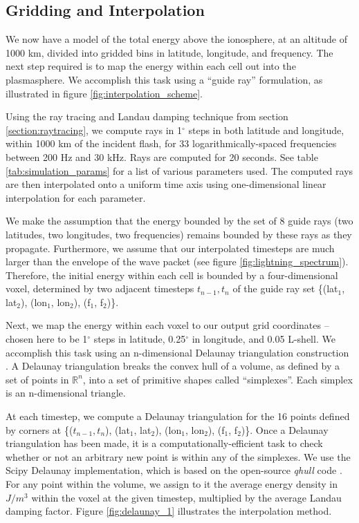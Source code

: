 \subsection{Gridding and Interpolation}

We now have a model of the total energy above the ionosphere, at an altitude of 1000 km, divided into gridded bins in latitude, longitude, and frequency. The next step required is to map the energy within each cell out into the plasmasphere. We accomplish this task using a ``guide ray'' formulation, as illustrated in figure \ref{fig:interpolation_scheme}.

Using the ray tracing and Landau damping technique from section \ref{section:raytracing}, we compute rays in 1$^\circ$ steps in both latitude and longitude, within 1000 km of the incident flash, for 33 logarithmically-spaced frequencies between 200 Hz and 30 kHz. Rays are computed for 20 seconds. See table \ref{tab:simulation_params} for a list of various parameters used. The computed rays are then interpolated onto a uniform time axis using one-dimensional linear interpolation for each parameter. 

We make the assumption that the energy bounded by the set of 8 guide rays (two latitudes, two longitudes, two frequencies) remains bounded by these rays as they propagate. Furthermore, we assume that our interpolated timesteps are much larger than the envelope of the wave packet (see figure \ref{fig:lightning_spectrum}). Therefore, the initial energy within each cell is bounded by a four-dimensional voxel, determined by two adjacent timesteps $t_{n-1}, t_n$ of the guide ray set \{(lat$_1$, lat$_2$), (lon$_1$, lon$_2$), (f$_1$, f$_2$)\}.

Next, we map the energy within each voxel to our output grid coordinates -- chosen here to be 1$^\circ$ steps in latitude, 0.25$^\circ$ in longitude, and 0.05 L-shell. We accomplish this task using an n-dimensional Delaunay triangulation construction \citep{Delaunay1934, Lee1980}. A Delaunay triangulation breaks the convex hull of a volume, as defined by a set of points in $\mathbb R^n$, into a set of primitive shapes called ``simplexes''. Each simplex is an n-dimensional triangle. 

At each timestep, we compute a Delaunay triangulation for the 16 points defined by corners at \{($t_{n-1}, t_n$), (lat$_1$, lat$_2$), (lon$_1$, lon$_2$), (f$_1$, f$_2$)\}. Once a Delaunay triangulation has been made, it is a computationally-efficient task to check whether or not an arbitrary new point is within any of the simplexes. We use the Scipy Delaunay implementation, which is based on the open-source \emph{qhull} code \citep{Barber1996}. For any point within the volume, we assign to it the average energy density in $J/m^3$ within the voxel at the given timestep, multiplied by the average Landau damping factor. Figure \ref{fig:delaunay_1} illustrates the interpolation method.


